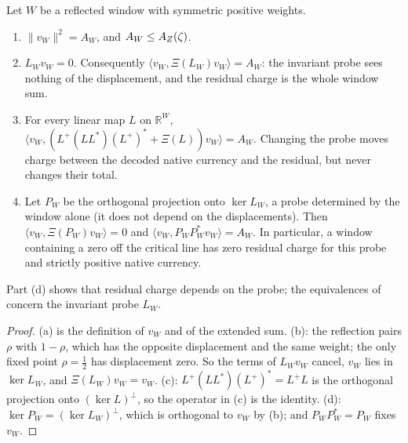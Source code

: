 \begin{proposition}
\label{prop:rh:window-identities}
Let \(W\) be a reflected window with symmetric positive weights.
\begin{enumerate}[label=\textup{(\alph*)}]
  \item \(\|v_W\|^2=A_W\), and \(A_W\leq A_{Z}(\zeta)\).
  \item \(L_Wv_W=0\).  Consequently
    \(\langle v_W,\Xi(L_W)v_W\rangle=A_W\): the invariant probe sees
    nothing of the displacement, and the residual charge is the whole
    window sum.
  \item For every linear map \(L\) on \(\mathbb R^W\),
    \(\langle v_W,(L^+(LL^*)(L^+)^*+\Xi(L))v_W\rangle=A_W\).  Changing the
    probe moves charge between the decoded native currency and the
    residual, but never changes their total.
  \item Let \(P_W\) be the orthogonal projection onto \(\ker L_W\), a probe
    determined by the window alone (it does not depend on the
    displacements).  Then
    \(\langle v_W,\Xi(P_W)v_W\rangle=0\) and
    \(\langle v_W,P_WP_W^*v_W\rangle=A_W\).  In particular, a window
    containing a zero off the critical line has zero residual charge for this probe and strictly positive native currency.
\end{enumerate}
Part (d) shows that residual charge depends on the probe; the
equivalences of  concern the
invariant probe \(L_W\).
\end{proposition}

\begin{proof}
(a) is the definition of \(v_W\) and of the extended sum.  (b): the
reflection pairs \(\rho\) with \(1-\rho\), which has the opposite
displacement and the same weight; the only fixed point \(\rho=\frac12\)
has displacement zero.  So the terms of \(L_Wv_W\) cancel, \(v_W\) lies in
\(\ker L_W\), and \(\Xi(L_W)v_W=v_W\).  (c): \(L^+(LL^*)(L^+)^*=L^+L\) is
the orthogonal projection onto \((\ker L)^\perp\), so the operator in
(c) is the identity.  (d): \(\ker P_W=(\ker L_W)^\perp\), which is
orthogonal to \(v_W\) by (b); and \(P_WP_W^*=P_W\) fixes \(v_W\).
\end{proof}

